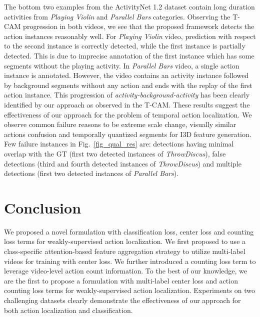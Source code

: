 \documentclass[10pt,twocolumn,letterpaper]{article}
\begin{document}
The bottom two examples from the ActivityNet 1.2 dataset contain long duration activities from \emph{Playing Violin} and \emph{Parallel Bars} categories. Observing the T-CAM progression in both videos, we see that the proposed framework detects the action instances reasonably well. For \emph{Playing Violin} video, prediction with respect to the second instance is correctly detected, while the first instance is partially detected. This is due to imprecise annotation of the first instance which has some segments without the playing activity. In \emph{Parallel Bars} video, a single action instance is annotated. However, the video contains an activity instance followed by background segments without any action and ends with the replay of the first action instance. This progression of \emph{activity-background-activity} has been clearly identified by our approach as observed in the T-CAM. These results suggest the effectiveness of our approach for the problem of temporal action localization. We observe common failure reasons to be extreme scale change, visually similar actions confusion and temporally quantized segments for I3D feature generation. Few failure instances in Fig.~\ref{fig_qual_res} are: detections having minimal overlap with the GT (first two detected instances of \emph{ThrowDiscus}), false detections (third and fourth detected instances of \emph{ThrowDiscus}) and multiple detections (first two detected instances of \emph{Parallel Bars}).



\section{Conclusion}
We proposed a novel formulation with classification loss, center loss and counting loss terms for weakly-supervised action localization. We first proposed to use a class-specific attention-based feature
aggregation strategy to utilize multi-label videos for
training with center loss. We further introduced a counting loss term to leverage video-level action count information. To the best of our knowledge, we are the first to propose a formulation with multi-label center loss and action counting loss terms for weakly-supervised action localization. Experiments on two challenging datasets clearly demonstrate the effectiveness of our approach for both action localization and classification. 


{\small


}
\end{document}
